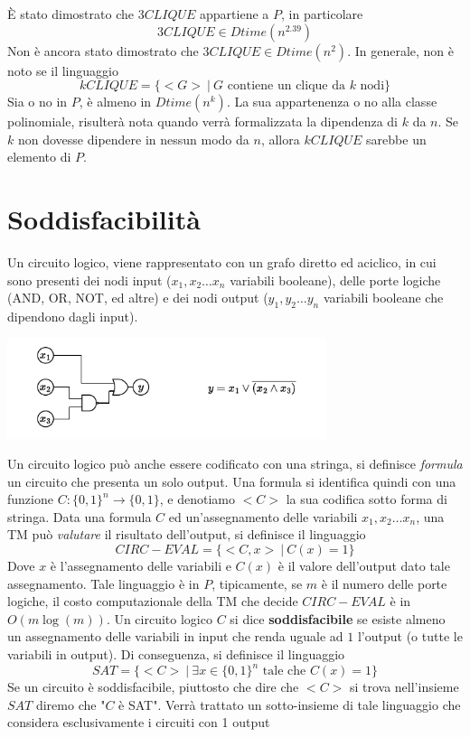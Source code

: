 \documentclass[10pt, letterpaper]{report}
\begin{document}
È stato dimostrato che $3CLIQUE$ appartiene a $P$, in particolare 
$$ 3CLIQUE\in Dtime(n^{2.39})$$
Non è ancora stato dimostrato che $ 3CLIQUE\in Dtime(n^{2})$. In generale, non è noto se il linguaggio
$$ kCLIQUE=\{<G> \ | \ G \text{ contiene un clique da $k$ nodi}\}$$ 
Sia o no in $P$, è almeno in $Dtime(n^k)$. La sua appartenenza o no alla classe polinomiale, risulterà nota quando verrà formalizzata la dipendenza di $k$ da $n$. Se $k$ non dovesse dipendere in nessun modo da $n$, allora $kCLIQUE$ sarebbe un elemento di $P$.\flowerLine 
\section{Soddisfacibilità}
Un circuito logico, viene rappresentato con un grafo diretto ed aciclico, in cui sono presenti dei nodi input ($x_1,x_2\dots x_n$ variabili booleane), delle porte logiche (AND, OR, NOT, ed altre) e dei nodi output ($y_1,y_2\dots y_n$ variabili booleane che dipendono dagli input).
\begin{center}
    \includegraphics[width=0.7\textwidth ]{images/circLogico.pdf}
\end{center}
Un circuito logico può anche essere codificato con una stringa, si definisce \textit{formula} un circuito che presenta un solo output. Una formula si identifica quindi con una funzione $C:\{0,1\}^n\rightarrow \{0,1\}$, e denotiamo $<C>$ la sua codifica sotto forma di stringa. Data una formula $C$ ed un'assegnamento delle variabili $x_1,x_2\dots x_n$, una TM può \textit{valutare} il risultato dell'output, si definisce il linguaggio 
$$ CIRC-EVAL = \{<C,x> \ | \ C(x)=1\}$$
Dove $x$ è l'assegnamento delle variabili e $C(x)$ è il valore dell'output dato tale assegnamento. Tale linguaggio è in $P$, tipicamente, se $m$ è il numero delle porte logiche, il costo computazionale della TM che decide $CIRC-EVAL$ è in $O(m\log(m))$.\acc 
{} Un circuito logico $C$ si dice \textbf{soddisfacibile} se esiste almeno un assegnamento delle variabili in input che renda uguale ad $1$ l'output (o tutte le variabili in output). Di conseguenza, si definisce il linguaggio 
$$ SAT = \{<C> \ | \ \exists x\in \{0,1\}^n \text{ tale che }C(x)=1\}$$
Se un circuito è soddisfacibile, piuttosto che dire che $<C>$ si trova nell'insieme $SAT$ diremo che "$C$ è SAT". Verrà trattato un sotto-insieme di tale linguaggio che considera esclusivamente i circuiti con 1 output 
\end{document}
